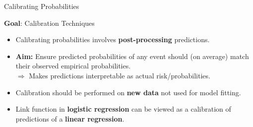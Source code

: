 \documentclass[11pt,compress,t,notes=noshow, xcolor=table]{beamer}
\begin{document}


\begin{frame}{Calibrating Probabilities}

\textbf{Goal}: Calibration Techniques

\begin{itemize}
  \item Calibrating probabilities involves \textbf{post-processing} predictions. %
  \item \textbf{Aim:} Ensure predicted probabilities of any event should (on average) match their observed empirical probabilities.\\
    $\Rightarrow$ Makes predictions interpretable as actual risk/probabilities.
  \item Calibration should be performed on \textbf{new data} not used for model fitting.
  \item Link function in \textbf{logistic regression} can be viewed as a calibration of predictions of a \textbf{linear regression}.
\end{itemize}

\end{frame}



\end{document}
